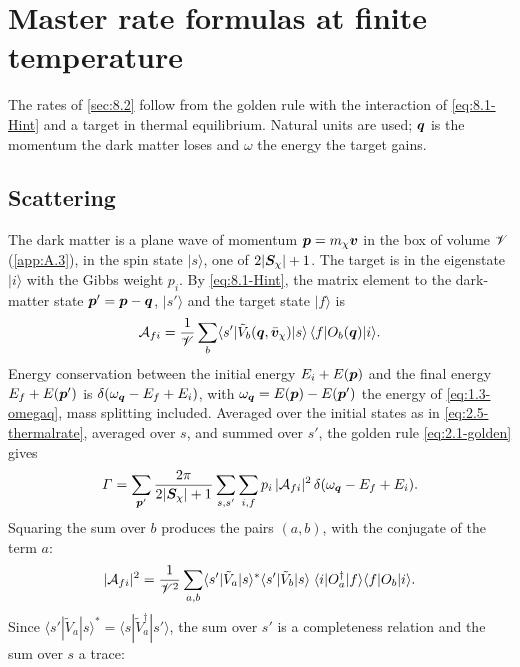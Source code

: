 \section{Master rate formulas at finite temperature}\label{app:D.25}

The rates of \cref{sec:8.2} follow from the golden rule with the interaction of \cref{eq:8.1-Hint} and a target in thermal equilibrium. Natural units are used; $\bm{q}$ is the momentum the dark matter loses and $\omega$ the energy the target gains.

\subsection{Scattering}

The dark matter is a plane wave of momentum $\bm{p} = m_{\chi}\bm{v}$ in the box of volume $\mathscr{V}$ (\cref{app:A.3}), in the spin state $|s\rangle$, one of $2|\bm{S}_\chi| + 1$. The target is in the eigenstate $|i\rangle$ with the Gibbs weight $p_i$. By \cref{eq:8.1-Hint}, the matrix element to the dark-matter state $\bm{p}' = \bm{p} - \bm{q}$, $|s'\rangle$ and the target state $|f\rangle$ is
\begin{equation*}
  \mathcal{A}_{fi} = \frac1{\mathscr{V}}\sum_b\langle s'|\tilde V_b(\bm{q},\bar{\bm{v}}_\chi)|s\rangle\,\langle f|O_b(\bm{q})|i\rangle .
\end{equation*}
Energy conservation between the initial energy $E_i + E(\bm{p})$ and the final energy $E_f + E(\bm{p}')$ is $\delta(\omega_{\bm{q}} - E_f + E_i)$, with $\omega_{\bm{q}} = E(\bm{p}) - E(\bm{p}')$ the energy of \cref{eq:1.3-omegaq}, mass splitting included. Averaged over the initial states as in \cref{eq:2.5-thermalrate}, averaged over $s$, and summed over $s'$, the golden rule \cref{eq:2.1-golden} gives
\begin{equation*}
  \varGamma = \sum_{\bm{p}'}\frac{2\pi}{2|\bm{S}_\chi| + 1}\sum_{s,s'}\sum_{i,f}p_i\,|\mathcal{A}_{fi}|^2\,\delta(\omega_{\bm{q}} - E_f + E_i) .
\end{equation*}
Squaring the sum over $b$ produces the pairs $(a, b)$, with the conjugate of the term $a$:
\begin{equation*}
  |\mathcal{A}_{fi}|^2 = \frac{1}{\mathscr{V}^2}\sum_{a,b}\langle s'|\tilde V_a|s\rangle^*\langle s'|\tilde V_b|s\rangle\;\langle i|O_a^\dagger|f\rangle\langle f|O_b|i\rangle .
\end{equation*}
Since $\langle s'|\tilde V_a|s\rangle^* = \langle s|\tilde V_a^\dagger|s'\rangle$, the sum over $s'$ is a completeness relation and the sum over $s$ a trace:
